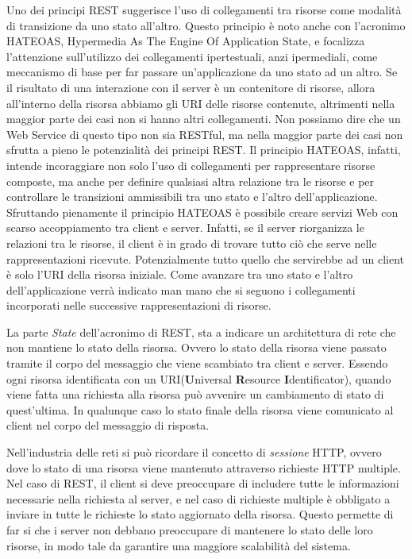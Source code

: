 \begin{description}
\begin{description}[leftmargin=0.5cm, labelindent=0.5cm]
\item[Hypermedia as the Engine of Application State (HATEOAS)] 
\label{itm:hateoas}
Uno dei principi REST suggerisce l'uso di collegamenti tra risorse come modalità di transizione da uno stato all'altro. Questo principio è noto anche con l'acronimo HATEOAS, Hypermedia As The Engine Of Application State, e focalizza l'attenzione sull'utilizzo dei collegamenti ipertestuali, anzi ipermediali, come meccanismo di base per far passare un'applicazione da uno stato ad un altro.
Se il risultato di una interazione con il server è un contenitore di risorse, allora all’interno della risorsa abbiamo gli URI delle risorse contenute, altrimenti nella maggior parte dei casi non si hanno altri collegamenti. Non possiamo dire che un Web Service di questo tipo non sia RESTful, ma nella maggior parte dei casi non sfrutta a pieno le potenzialità dei principi REST.
Il principio HATEOAS, infatti, intende incoraggiare non solo l’uso di collegamenti per rappresentare risorse composte, ma anche per definire qualsiasi altra relazione tra le risorse e per controllare le transizioni ammissibili tra uno stato e l’altro dell’applicazione.
Sfruttando pienamente il principio HATEOAS è possibile creare servizi Web con scarso accoppiamento tra client e server. Infatti, se il server riorganizza le relazioni tra le risorse, il client è in grado di trovare tutto ciò che serve nelle rappresentazioni ricevute. Potenzialmente tutto quello che servirebbe ad un client è solo l’URI della risorsa iniziale. Come avanzare tra uno stato e l’altro dell’applicazione verrà indicato man mano che si seguono i collegamenti incorporati nelle successive rappresentazioni di risorse.
\hspace*{\fill}\cite{web:hateoas}
\end{description}


\item[Stateless]

La parte \emph{State} dell'acronimo di REST, sta a indicare un architettura di rete che non mantiene lo stato della risorsa. Ovvero lo stato della risorsa viene passato tramite il corpo del messaggio che viene scambiato tra client e server. Essendo ogni risorsa identificata con un URI(\textbf{U}niversal \textbf{R}esource \textbf{I}dentificator), quando viene fatta una richiesta alla risorsa può avvenire un cambiamento di stato di quest'ultima. In qualunque caso lo stato finale della risorsa viene comunicato al client nel corpo del messaggio di risposta.

Nell'industria delle reti si può ricordare il concetto di \emph{sessione} HTTP, ovvero dove lo stato di una risorsa viene mantenuto attraverso richieste HTTP multiple. Nel caso di REST, il client si deve preoccupare di includere tutte le informazioni necessarie nella richiesta al server, e nel caso di richieste multiple è obbligato a inviare in tutte le richieste lo stato aggiornato della risorsa. Questo permette di far si che i server non debbano preoccupare di mantenere lo stato delle loro risorse, in modo tale da garantire una maggiore scalabilità del sistema.


\end{description}
